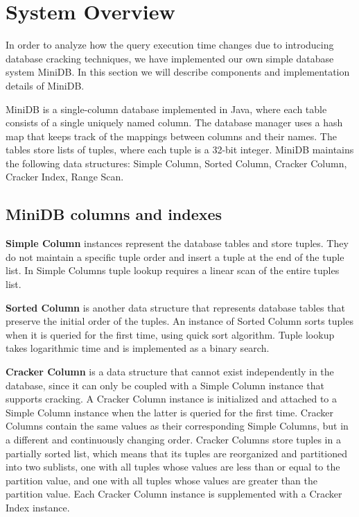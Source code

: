 \section{System Overview}
In order to analyze how the query execution time changes due to introducing database cracking techniques, we have implemented our own simple database system MiniDB. In this section we will describe components and implementation details of MiniDB.

MiniDB is a single-column database implemented in Java, where each table consists of a single uniquely named column. The database manager uses a hash map that keeps track of the mappings between columns and their names.  The tables store lists of tuples, where each tuple is a 32-bit integer. MiniDB maintains the following data structures: Simple Column, Sorted Column, Cracker Column, Cracker Index, Range Scan. 
\label{sec:system}

\subsection{MiniDB columns and indexes}
\textbf{Simple Column} instances represent the database tables and store tuples. They do not maintain a specific tuple order and insert a tuple at the end of the tuple list. In Simple Columns tuple lookup requires a linear scan of the entire tuples list. 

\textbf{Sorted Column} is another data structure that represents database tables that preserve the initial order of the tuples. An instance of Sorted Column sorts tuples when it is queried for the first time, using quick sort algorithm. Tuple lookup takes logarithmic time and is implemented as a binary search. 

\textbf{Cracker Column} is a data structure that cannot exist independently in the database, since it can only be coupled with a Simple Column instance that supports cracking. A Cracker Column instance is initialized and attached to a Simple Column instance when the latter is queried for the first time. Cracker Columns contain the same values as their corresponding Simple Columns, but in a different and continuously changing order. Cracker Columns store tuples in a partially sorted list, which means that its tuples are reorganized and partitioned into two sublists, one with all tuples whose values are less than or equal to the partition value, and one with all tuples whose values are greater than the partition value. Each Cracker Column instance is supplemented with a  Cracker Index instance. 


